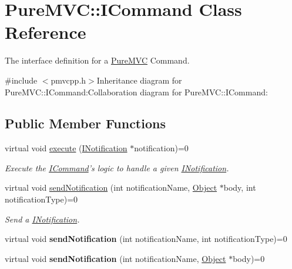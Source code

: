 \hypertarget{class_pure_m_v_c_1_1_i_command}{
\section{PureMVC::ICommand Class Reference}
\label{class_pure_m_v_c_1_1_i_command}
}


The interface definition for a \hyperlink{namespace_pure_m_v_c}{PureMVC} Command.  


{\ttfamily \#include $<$pmvcpp.h$>$}Inheritance diagram for PureMVC::ICommand:Collaboration diagram for PureMVC::ICommand:\subsection*{Public Member Functions}
\begin{DoxyCompactItemize}
\item 
virtual void \hyperlink{class_pure_m_v_c_1_1_i_command_a901132c675301f8e82b1739b54a396b3}{execute} (\hyperlink{class_pure_m_v_c_1_1_i_notification}{INotification} $\ast$notification)=0
\begin{DoxyCompactList}\small\item\em Execute the {\ttfamily \hyperlink{class_pure_m_v_c_1_1_i_command}{ICommand}}'s logic to handle a given {\ttfamily \hyperlink{class_pure_m_v_c_1_1_i_notification}{INotification}}. \item\end{DoxyCompactList}\item 
virtual void \hyperlink{class_pure_m_v_c_1_1_i_notifier_a65e8333ccfea74138b79f84dac96af25}{sendNotification} (int notificationName, \hyperlink{class_pure_m_v_c_1_1_object}{Object} $\ast$body, int notificationType)=0
\begin{DoxyCompactList}\small\item\em Send a {\ttfamily \hyperlink{class_pure_m_v_c_1_1_i_notification}{INotification}}. \item\end{DoxyCompactList}\item 
\hypertarget{class_pure_m_v_c_1_1_i_notifier_ad9421945c1e0fd6d7ebbc136f9ecfba3}{
virtual void {\bfseries sendNotification} (int notificationName, int notificationType)=0}
\label{class_pure_m_v_c_1_1_i_notifier_ad9421945c1e0fd6d7ebbc136f9ecfba3}

\item 
\hypertarget{class_pure_m_v_c_1_1_i_notifier_a4d6bac0719be96948e4f7417489daeaa}{
virtual void {\bfseries sendNotification} (int notificationName, \hyperlink{class_pure_m_v_c_1_1_object}{Object} $\ast$body)=0}
\label{class_pure_m_v_c_1_1_i_notifier_a4d6bac0719be96948e4f7417489daeaa}


\end{DoxyCompactItemize}
